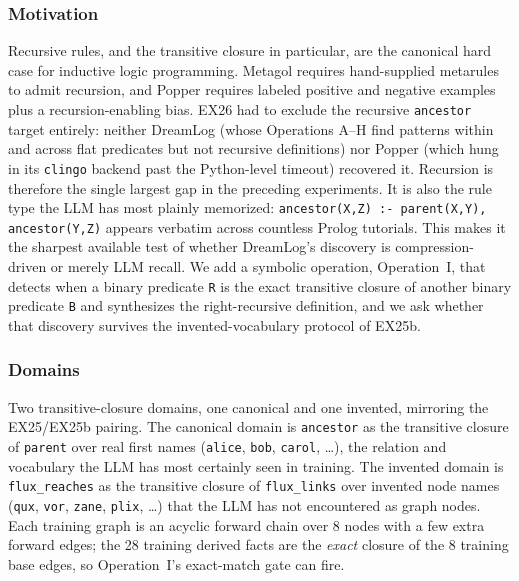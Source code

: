 \documentclass[10pt,conference]{IEEEtran}
\begin{document}
\subsubsection{Motivation}
Recursive rules, and the transitive closure in particular, are the canonical hard case for inductive logic programming. Metagol requires hand-supplied metarules to admit recursion, and Popper requires labeled positive and negative examples plus a recursion-enabling bias. EX26 had to exclude the recursive \texttt{ancestor} target entirely: neither DreamLog (whose Operations A--H find patterns within and across flat predicates but not recursive definitions) nor Popper (which hung in its \texttt{clingo} backend past the Python-level timeout) recovered it. Recursion is therefore the single largest gap in the preceding experiments. It is also the rule type the LLM has most plainly memorized: \texttt{ancestor(X,Z) :- parent(X,Y), ancestor(Y,Z)} appears verbatim across countless Prolog tutorials. This makes it the sharpest available test of whether DreamLog's discovery is compression-driven or merely LLM recall. We add a symbolic operation, Operation~I, that detects when a binary predicate \texttt{R} is the exact transitive closure of another binary predicate \texttt{B} and synthesizes the right-recursive definition, and we ask whether that discovery survives the invented-vocabulary protocol of EX25b.

\subsubsection{Domains}
Two transitive-closure domains, one canonical and one invented, mirroring the EX25/EX25b pairing. The canonical domain is \texttt{ancestor} as the transitive closure of \texttt{parent} over real first names (\texttt{alice}, \texttt{bob}, \texttt{carol}, \ldots), the relation and vocabulary the LLM has most certainly seen in training. The invented domain is \texttt{flux\_reaches} as the transitive closure of \texttt{flux\_links} over invented node names (\texttt{qux}, \texttt{vor}, \texttt{zane}, \texttt{plix}, \ldots) that the LLM has not encountered as graph nodes. Each training graph is an acyclic forward chain over 8 nodes with a few extra forward edges; the 28 training derived facts are the \emph{exact} closure of the 8 training base edges, so Operation~I's exact-match gate can fire.
\end{document}

